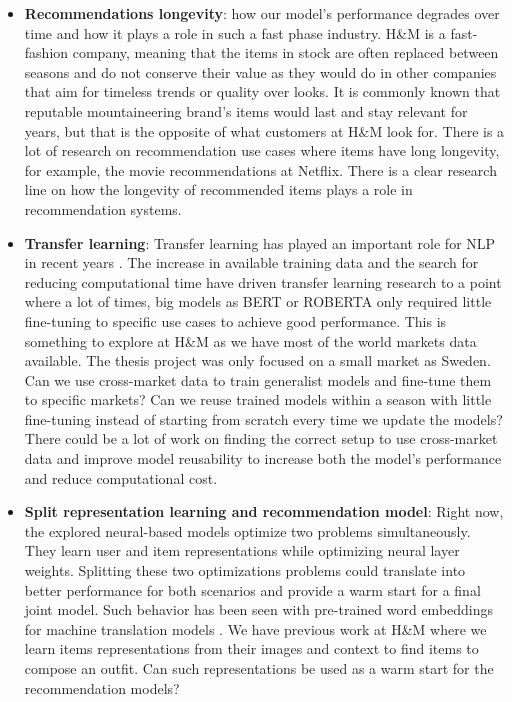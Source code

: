 \documentclass{kththesis}
\begin{document}
\begin{itemize}
    \item \textbf{Recommendations longevity}: how our model's performance degrades over time and how it plays a role in such a fast phase industry. H\&M is a fast-fashion company, meaning that the items in stock are often replaced between seasons and do not conserve their value as they would do in other companies that aim for timeless trends or quality over looks. It is commonly known that reputable mountaineering brand's items would last and stay relevant for years, but that is the opposite of what customers at H\&M look for. There is a lot of research on recommendation use cases where items have long longevity, for example, the movie recommendations at Netflix. There is a clear research line on how the longevity of recommended items plays a role in recommendation systems.
    
    \item \textbf{Transfer learning}: Transfer learning has played an important role for NLP in recent years \cite{ruder2019transfer}. The increase in available training data and the search for reducing computational time have driven transfer learning research to a point where a lot of times, big models as BERT or ROBERTA only required little fine-tuning to specific use cases to achieve good performance. This is something to explore at H\&M as we have most of the world markets data available. The thesis project was only focused on a small market as Sweden. Can we use cross-market data to train generalist models and fine-tune them to specific markets? Can we reuse trained models within a season with little fine-tuning instead of starting from scratch every time we update the models? There could be a lot of work on finding the correct setup to use cross-market data and improve model reusability to increase both the model's performance and reduce computational cost.
    
    \item \textbf{ Split representation learning and recommendation model}: Right now, the explored neural-based models optimize two problems simultaneously. They learn user and item representations while optimizing neural layer weights. Splitting these two optimizations problems could translate into better performance for both scenarios and provide a warm start for a final joint model. Such behavior has been seen with pre-trained word embeddings for machine translation models \cite{glove}. We have previous work at H\&M \cite{hm2vec} where we learn items representations from their images and context to find items to compose an outfit. Can such representations be used as a warm start for the recommendation models?
    

\end{itemize}
\end{document}
